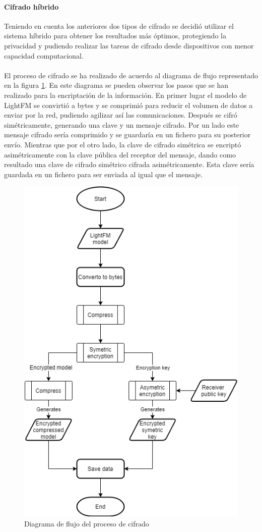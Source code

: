 \paragraph{Cifrado híbrido}
Teniendo en cuenta los anteriores dos tipos de cifrado se decidió utilizar el sistema híbrido para obtener los resultados más óptimos, protegiendo la privacidad y pudiendo realizar las tareas de cifrado desde dispositivos con menor capacidad computacional.
\\ \\ 
El proceso de cifrado se ha realizado de acuerdo al diagrama de flujo representado en la figura \ref{fig:Flow_Encryption}. En este diagrama se pueden observar los pasos que se han realizado para la encriptación de la información. En primer lugar el modelo de LightFM se convirtió a bytes y se comprimió para reducir el volumen de datos a enviar por la red, pudiendo agilizar así las comunicaciones. Después se cifró simétricamente, generando una clave y un mensaje cifrado. Por un lado este mensaje cifrado sería comprimido y se guardaría en un fichero para su posterior envío. Mientras que por el otro lado, la clave de cifrado simétrica se encriptó asimétricamente con la clave pública del receptor del mensaje, dando como resultado una clave de cifrado simétrico cifrada asimétricamente. Esta clave sería guardada en un fichero para ser enviada al igual que el mensaje.
\begin{figure}[H]
    \centering
    \includegraphics[height=0.6\textheight]{Figuras/flowchart_encryption.png}    
    \caption{Diagrama de flujo del proceso de cifrado} 
    \label{fig:Flow_Encryption}
\end{figure}


